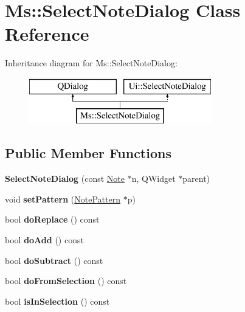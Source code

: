 \hypertarget{class_ms_1_1_select_note_dialog}{}\section{Ms\+:\+:Select\+Note\+Dialog Class Reference}
\label{class_ms_1_1_select_note_dialog}
Inheritance diagram for Ms\+:\+:Select\+Note\+Dialog\+:\begin{figure}[H]
\begin{center}
\leavevmode
\includegraphics[height=2.000000cm]{class_ms_1_1_select_note_dialog}
\end{center}
\end{figure}
\subsection*{Public Member Functions}
\begin{DoxyCompactItemize}
\item 
\mbox{\label{class_ms_1_1_select_note_dialog_aa5cfd8660a8037b9f65562612ddba4ef}} 
{\bfseries Select\+Note\+Dialog} (const \hyperlink{class_ms_1_1_note}{Note} $\ast$n, Q\+Widget $\ast$parent)
\item 
\mbox{\label{class_ms_1_1_select_note_dialog_acbbf3a5739ad985d4e5c903549ea7121}} 
void {\bfseries set\+Pattern} (\hyperlink{struct_ms_1_1_note_pattern}{Note\+Pattern} $\ast$p)
\item 
\mbox{\label{class_ms_1_1_select_note_dialog_ae335742140cd3947df355fc8ad2595d0}} 
bool {\bfseries do\+Replace} () const
\item 
\mbox{\label{class_ms_1_1_select_note_dialog_ac4b6b7bafbd7129477aeb5f396a28ed2}} 
bool {\bfseries do\+Add} () const
\item 
\mbox{\label{class_ms_1_1_select_note_dialog_a7498a202160447e50314bba8eaaae867}} 
bool {\bfseries do\+Subtract} () const
\item 
\mbox{\label{class_ms_1_1_select_note_dialog_a57507b34e129ad5d68427856d44feef4}} 
bool {\bfseries do\+From\+Selection} () const
\item 
\mbox{\label{class_ms_1_1_select_note_dialog_a9c62257640009fb265e39accea1c8516}} 
bool {\bfseries is\+In\+Selection} () const
\end{DoxyCompactItemize}


